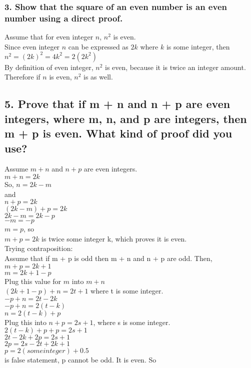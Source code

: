 \documentclass[11pt, oneside]{article} %
\numberwithin{equation}{section} %
\numberwithin{figure}{section} %
\numberwithin{table}{section} %
\begin{document}

\subsubsection{3. Show that the square of an even number is an even number using a direct proof.}
Assume that for even integer $n$, $n^2$ is even. \\  
Since even integer $n$ can be expressed as $2k$ where $k$ is some integer, then \\
$n^2 =(2k)^2 = 4k^2 = 2(2k^2) $ \\
By definition of even integer, $n^2$ is even, because it is twice an integer amount. Therefore if $n$ is even, $n^2$ is as well. 

\subsection{5. Prove that if m + n and n + p are even integers, where m, n, and p are integers, then m + p is even. What kind of proof did you use?}
Assume $m + n$ and $n + p$ are even integers. \\
$m + n = 2k$\\
So, $n = 2k - m$\\
and \\
$n + p = 2k$\\
$(2k - m) + p = 2k$\\
$2k - m = 2k - p$\\
$-m = -p$ \\
$m = p$, so\\
$m + p = 2k$ is twice some integer k, which proves it is even. \\
Trying contraposition:\\
Assume that if m + p is odd then m + n and n + p are odd.
Then, \\
$m + p = 2k + 1$\\ 
$m = 2k + 1 - p$\\ 
Plug this value for $m$ into $m + n$ \\
$(2k + 1 - p) + n = 2t + 1$ where t is some integer. \\
$-p  + n =2t - 2k$\\
$-p  + n =2(t - k)$\\
$ n = 2(t - k) + p$\\
Plug this into $n + p = 2s + 1$, where s is some integer. \\
$2(t - k) + p + p = 2s + 1$\\
$2t - 2k + 2p = 2s + 1$\\
$2p= 2s-2t+2k +1 $\\
$ p = 2(some integer) + 0.5$\\ is false statement, p cannot be odd. It is even. So 
\end{document}
